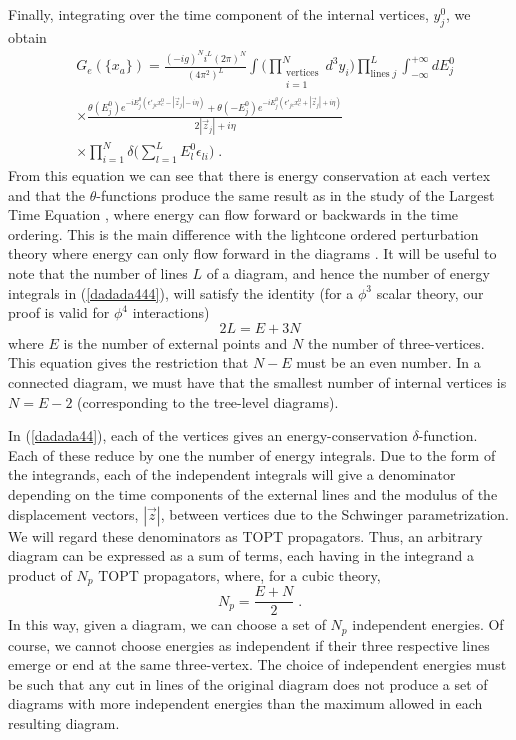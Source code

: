 \documentclass[%
 reprint,
 amsmath,amssymb,
 aps,
]{revtex4-1}
\begin{document}
Finally, integrating over the time component of the internal vertices, $y^0_j$, we obtain
\begin{align}
&G_e(\{x_a\})=\frac{(-ig)^Ni^L(2\pi)^N}{(4\pi^2)^L}\int\Big(\prod_{\substack{\text{vertices}\\i=1}}^Nd^3y_i\Big)\prod_{\text{lines}\;j}^L\int_{-\infty}^{+\infty}{dE^0_j}\nonumber\\
&\times\frac{\theta(E_j^0)e^{-iE_j^0(\epsilon'_{jc}x^0_c-|\vec{z}_j|-i\eta)}+\theta(-E_j^0)e^{-iE_j^0(\epsilon'_{jc}x^0_c+|\vec{z}_j|+i\eta)}}{2|{\vec{z}_j}|+i\eta}\nonumber\\&\times\prod_{i=1}^N\delta\Big(\sum_{l=1}^LE_{l}^0\epsilon_{li}\Big)\;.\label{dadada444}
\end{align}
From this equation we can see that there is energy conservation at each vertex and that the $\theta$-functions produce the same result as in the study of the Largest Time Equation \cite{Veltman2}, where energy can flow forward or backwards in the time ordering. This is the main difference with the lightcone ordered perturbation theory where energy can only flow forward in the diagrams \cite{Sterman3}. It will be useful to note that the number of lines $L$ of a diagram, and hence the number of energy integrals in (\ref{dadada444}), will satisfy the identity (for a $\phi^3$ scalar theory, our proof is valid for $\phi^4$ interactions)
\begin{equation}
2L=E+3N
\end{equation}
where $E$ is the number of external points and $N$ the number of three-vertices. This equation gives the restriction that $N-E$ must be an even number. In a connected diagram, we must have that the smallest number of internal vertices is $N=E-2$ (corresponding to the tree-level diagrams).

 In (\ref{dadada44}), each of the vertices gives an energy-conservation $\delta$-function. Each of these reduce by one the number of energy integrals. Due to the form of the integrands, each of the independent integrals will give a denominator depending on the time components of the external lines and the modulus of the displacement vectors, $|\vec{z}|$, between vertices due to the Schwinger parametrization. We will regard these denominators as TOPT propagators. Thus, an arbitrary diagram can be expressed as a sum of terms, each having in the integrand a product of $N_p$ TOPT propagators, where, for a cubic theory,
\begin{equation}
N_p=\frac{E+N}{2}\;.
\end{equation}
In this way, given a diagram, we can choose a set of $N_p$ independent energies. Of course, we cannot choose energies as independent if their three respective lines emerge or end at the same three-vertex. The choice of independent energies must be such that any cut in lines of the original diagram does not produce a set of diagrams with more independent energies than the maximum allowed in each resulting diagram. 
\par
\end{document}
